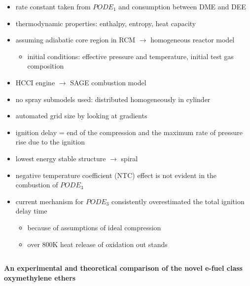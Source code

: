 \documentclass[12pt,oneside,a4paper,english]{article}
\begin{document}
\begin{itemize}
\item{rate constant taken from $PODE_1$ and consumption between DME and DEE}
\item{thermodynamic properties: enthalpy, entropy, heat capacity}
\item{assuming adiabatic core region in RCM $\rightarrow$ homogeneous reactor model}

	\begin{itemize}
	\item{initial conditions: effective pressure and temperature, initial test gas composition}
	\end{itemize}

\item{HCCI engine $\rightarrow$ SAGE combustion model}
\item{no spray submodels used: distributed homogeneously in cylinder}
\item{automated grid size by looking at gradients}
\item{ignition delay = end of the compression and the maximum rate of pressure rise due to the ignition}
\item{lowest energy stable structure $\rightarrow$ spiral}
\item{negative temperature coefficient (NTC) effect is not evident in the combustion of $PODE_3$}
\item{current mechanism for $PODE_3$ consistently overestimated the total ignition delay time}

	\begin{itemize}
	\item{because of assumptions of ideal compression}
	\item{over 800K heat release of oxidation out stands} \\
	\end{itemize}

\end{itemize}

 
\subsection{\cite{Jacobs2019}} %
\textbf{An experimental and theoretical comparison of the novel e-fuel class oxymethylene ethers}
\end{document}
